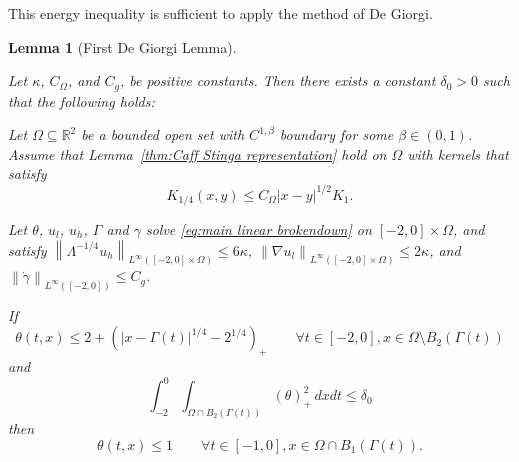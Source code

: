 \documentclass[11pt]{amsart}
\newtheorem{lemma}[theorem]{Lemma}
\theoremstyle{remark}
\theoremstyle{definition}
\newcommand{\R}{\mathbb{R}}
\newcommand{\norm}[1]{\left\lVert#1\right\rVert}
\newcommand{\paren}[1]{\left( #1 \right)}
\newcommand{\grad}{\nabla}
\newcommand{\ulow}{u_l}
\newcommand{\uhigh}{u_h}
\newcommand{\Cgamma}{C_g}
\newcommand{\Comega}{C_\Omega}
\begin{document}
This energy inequality is sufficient to apply the method of De Giorgi.  

\begin{lemma}[First De Giorgi Lemma] \label{thm:DG1}

Let $\kappa$, $\Comega$, and $\Cgamma$, be positive constants. Then there exists a constant $\delta_0>0$ such that the following holds:

Let $\Omega \subseteq \R^2$ be a bounded open set with $C^{1,\beta}$ boundary for some $\beta \in (0,1)$.  Assume that Lemma~\ref{thm:Caff Stinga representation} hold on $\Omega$ with kernels that satisfy
\[ K_{1/4}(x,y) \leq \Comega |x-y|^{1/2} K_{1}. \]

Let $\theta$, $\ulow$, $\uhigh$, $\Gamma$ and $\gamma$ solve \eqref{eq:main linear brokendown} on $[-2,0]\times\Omega$, and satisfy $\norm{\Lambda^{-1/4} \uhigh}_{L^\infty([-2,0]\times\Omega)} \leq 6 \kappa$, $\norm{\grad \ulow}_{L^\infty([-2,0]\times\Omega)} \leq 2\kappa$, and $\norm{\dot{\gamma}}_{L^\infty([-2,0])} \leq \Cgamma$.  

If
\[ \theta(t,x) \leq 2 + \paren{|x-\Gamma(t)|^{1/4}-2^{1/4}}_+ \qquad \forall t\in[-2,0], x \in \Omega \setminus B_2(\Gamma(t)) \]
and
\[ \int_{-2}^0 \int_{\Omega\cap B_2(\Gamma(t))} (\theta)_+^2 \,dxdt \leq \delta_0 \]
then
\[ \theta(t,x) \leq 1 \qquad \forall t \in [-1,0], x \in \Omega \cap B_1(\Gamma(t)). \]

\end{lemma}
\end{document}

